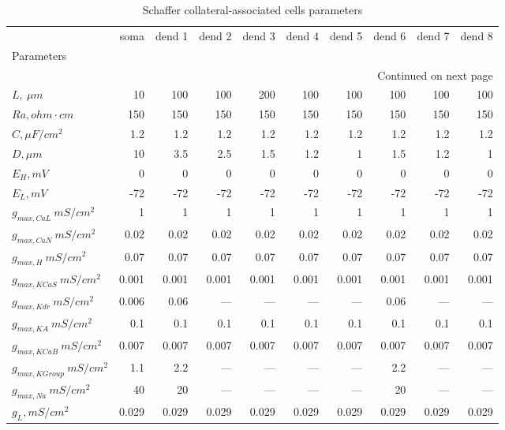 \begin{longtable}{lrrrrrrrrr}
\caption{Schaffer collateral-associated cells parameters}\label{ca1_sca_cell_parameters}\\
\toprule
{} &  soma & dend 1 & dend 2 & dend 3 & dend 4 & dend 5 & dend 6 & dend 7 & dend 8 \\
Parameters      &       &        &        &        &        &        &        &        &        \\
\midrule
\endhead
\midrule
\multicolumn{10}{r}{{Continued on next page}} \\
\midrule
\endfoot

\bottomrule
\endlastfoot
$L, \ \mu m$ &    10 &    100 &    100 &    200 &    100 &    100 &    100 &    100 &    100 \\
$Ra,
 ohm \cdot cm$              &   150 &    150 &    150 &    150 &    150 &    150 &    150 &    150 &    150 \\
$C, \mu F / cm^2$              &   1.2 &    1.2 &    1.2 &    1.2 &    1.2 &    1.2 &    1.2 &    1.2 &    1.2 \\
$D, \mu m$            &    10 &    3.5 &    2.5 &    1.5 &    1.2 &      1 &    1.5 &    1.2 &      1 \\
$E_{H}, mV$        &     0 &      0 &      0 &      0 &      0 &      0 &      0 &      0 &      0 \\
$E_L,  mV$       &   -72 &    -72 &    -72 &    -72 &    -72 &    -72 &    -72 &    -72 &    -72 \\
$g_{max, CaL    }\  mS / cm^2$&     1 &      1 &      1 &      1 &      1 &      1 &      1 &      1 &      1 \\
$g_{max, CaN    }\  mS / cm^2$&  0.02 &   0.02 &   0.02 &   0.02 &   0.02 &   0.02 &   0.02 &   0.02 &   0.02 \\
$g_{max, H     }\  mS / cm^2$&  0.07 &   0.07 &   0.07 &   0.07 &   0.07 &   0.07 &   0.07 &   0.07 &   0.07 \\
$g_{max, KCaS    }\  mS / cm^2$& 0.001 &  0.001 &  0.001 &  0.001 &  0.001 &  0.001 &  0.001 &  0.001 &  0.001 \\
$g_{max, Kdr }\  mS / cm^2$& 0.006 &   0.06 &   ---  &   ---  &   ---  &   ---  &   0.06 &   ---  &   ---  \\
$g_{max, KA     }\  mS / cm^2$&   0.1 &    0.1 &    0.1 &    0.1 &    0.1 &    0.1 &    0.1 &    0.1 &    0.1 \\
$g_{max, KCaB   }\  mS / cm^2$& 0.007 &  0.007 &  0.007 &  0.007 &  0.007 &  0.007 &  0.007 &  0.007 &  0.007 \\
$g_{max, KGroup }\  mS / cm^2$&   1.1 &    2.2 &   ---  &   ---  &   ---  &   ---  &    2.2 &   ---  &   ---  \\
$g_{max, Na  }\  mS / cm^2$&    40 &     20 &   ---  &   ---  &   ---  &   ---  &     20 &   ---  &   ---  \\
$g_L,  mS / cm^2$    & 0.029 &  0.029 &  0.029 &  0.029 &  0.029 &  0.029 &  0.029 &  0.029 &  0.029 \\
\end{longtable}

